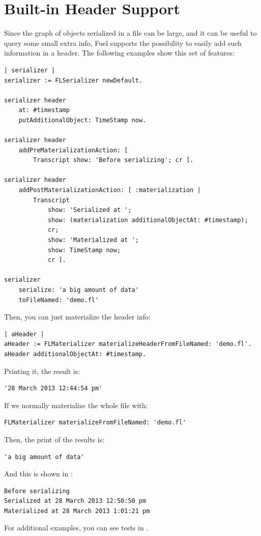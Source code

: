 \documentclass[a4paper,10pt,twoside]{book}
\begin{document}
\section{Built-in Header Support}

Since the graph of objects serialized in a file can be large, and it can be useful to query some small extra info, Fuel supports the possibility to easily add such information in a header. The following examples show this set of features:
 
\begin{lstlisting}
| serializer |
serializer := FLSerializer newDefault.

serializer header 
	at: #timestamp
	putAdditionalObject: TimeStamp now.

serializer header
	addPreMaterializationAction: [ 
		Transcript show: 'Before serializing'; cr ].

serializer header
	addPostMaterializationAction: [ :materialization | 
		Transcript 
			show: 'Serialized at ';
			show: (materialization additionalObjectAt: #timestamp); 
			cr;
			show: 'Materialized at ';
			show: TimeStamp now; 
			cr ].
	
serializer 
	serialize: 'a big amount of data' 
	toFileNamed: 'demo.fl'
\end{lstlisting}

Then, you can just materialize the header info:

\begin{lstlisting}
| aHeader |
aHeader := FLMaterializer materializeHeaderFromFileNamed: 'demo.fl'.
aHeader additionalObjectAt: #timestamp.
\end{lstlisting}

Printing it, the result is:

\begin{lstlisting}
'28 March 2013 12:44:54 pm'
\end{lstlisting}

If we normally materialize the whole file with:

\begin{lstlisting}
FLMaterializer materializeFromFileNamed: 'demo.fl' 
\end{lstlisting}

Then, the print of the results is:

\begin{lstlisting}
'a big amount of data'
\end{lstlisting}

And this is shown in :

\begin{lstlisting}
Before serializing
Serialized at 28 March 2013 12:50:50 pm
Materialized at 28 March 2013 1:01:21 pm
\end{lstlisting}
 
For additional examples, you can see tests in .
\ifx\wholebook\relax\else
   
\end{document}
